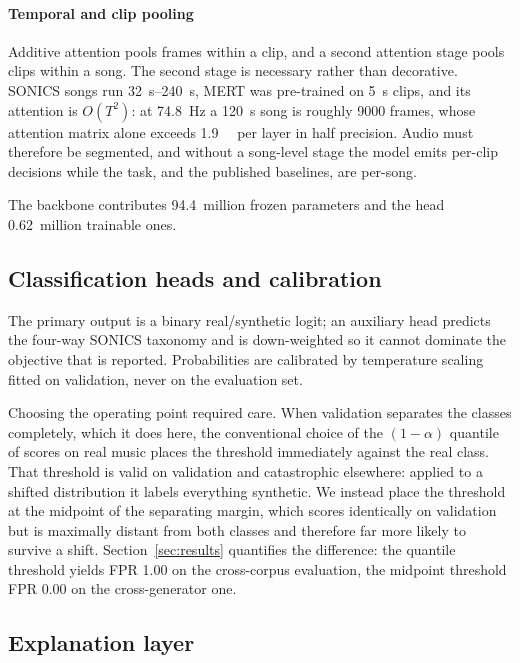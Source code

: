\paragraph{Temporal and clip pooling}
Additive attention pools frames within a clip, and a second attention stage
pools clips within a song. The second stage is necessary rather than
decorative. SONICS songs run \SIrange{32}{240}{\second}, MERT was pre-trained on
\SI{5}{\second} clips, and its attention is $O(T^2)$: at \SI{74.8}{\hertz} a
\SI{120}{\second} song is roughly 9000 frames, whose attention matrix alone
exceeds \SI{1.9}{\giga\byte} per layer in half precision. Audio must therefore
be segmented, and without a song-level stage the model emits per-clip decisions
while the task, and the published baselines, are per-song.

The backbone contributes \num{94.4}~million frozen parameters and the head
\num{0.62}~million trainable ones.

\subsection{Classification heads and calibration}

The primary output is a binary real/synthetic logit; an auxiliary head predicts
the four-way SONICS taxonomy and is down-weighted so it cannot dominate the
objective that is reported. Probabilities are calibrated by temperature scaling
fitted on validation, never on the evaluation set.

Choosing the operating point required care. When validation separates the
classes completely, which it does here, the conventional choice of the
$(1-\alpha)$ quantile of scores on real music places the threshold immediately
against the real class. That threshold is valid on validation and catastrophic
elsewhere: applied to a shifted distribution it labels everything synthetic. We
instead place the threshold at the midpoint of the separating margin, which
scores identically on validation but is maximally distant from both classes and
therefore far more likely to survive a shift. Section~\ref{sec:results}
quantifies the difference: the quantile threshold yields FPR 1.00 on the
cross-corpus evaluation, the midpoint threshold FPR 0.00 on the cross-generator
one.

\subsection{Explanation layer}

